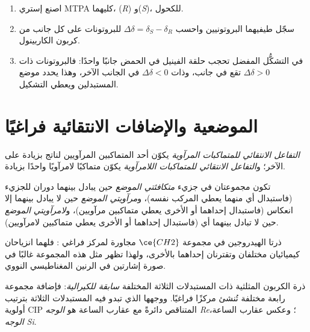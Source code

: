 \begin{method}\label{met:b3:asymmetric-synthesis:mosher}
\begin{enumerate}
  \item اصنع إستري MTPA كليهما، (\textit{R}) و(\textit{S})، للكحول.
  \item سجّل طيفيهما البروتونيين واحسب $\Delta\delta = \delta_S - \delta_R$ للبروتونات على كل
        جانب من كربون الكاربينول.
  \item في التشكُّل المفضل تحجب حلقة الفينيل في الحمض جانبًا واحدًا:
        فالبروتونات ذات $\Delta\delta > 0$ تقع في جانب، وذات $\Delta\delta < 0$ في الجانب الآخر، وهذا
        يحدد موضع المستبدلين ويعطي التشكيل.
\end{enumerate}
\end{method}

\section{الموضعية والإضافات الانتقائية فراغيًا}

\begin{definition}\label{def:b3:asymmetric-synthesis:selective}
\emph{التفاعل الانتقائي للمتماكبات المرآوية} يكوّن أحد
المتماكبين المرآويين لناتج بزيادة على الآخر؛ و\emph{التفاعل الانتقائي للمتماكبات
اللامرآوية} يكوّن متماكبًا لامرآويًا واحدًا بزيادة.
\end{definition}

\begin{definition}[الموضعية]\label{def:b3:asymmetric-synthesis:topicity}
تكون مجموعتان في جزيء \emph{متكافئتي الموضع} حين يبادل بينهما
دوران للجزيء (فاستبدال أي منهما يعطي المركب نفسه)،
و\emph{مرآويتي الموضع} حين لا يبادل بينهما إلا انعكاس
(فاستبدال إحداهما أو الأخرى يعطي متماكبين مرآويين)، 
و\emph{لامرآويتي الموضع} حين لا تبادل بينهما أي 
(فاستبدال إحداهما أو الأخرى يعطي متماكبين لامرآويين).
\end{definition}

ذرتا الهيدروجين في مجموعة $\ce{CH2}$ مجاورة لمركز فراغي : فلهما
انزياحان كيميائيان مختلفان وتقترنان إحداهما بالأخرى، ولهذا تظهر مثل هذه
المجموعة غالبًا في صورة إشارتين في الرنين المغناطيسي النووي.

\begin{definition}\label{def:b3:asymmetric-synthesis:faces}
ذرة الكربون المثلثية ذات المستبدلات الثلاثة المختلفة \emph{سابقة للكيرالية}:
فإضافة مجموعة رابعة مختلفة تُنشئ مركزًا فراغيًا. ووجهها الذي تبدو فيه
المستبدلات الثلاثة بترتيب أولوية CIP المتناقص دائرةً مع عقارب الساعة هو
\emph{الوجه Re}؛ وعكس عقارب الساعة، \emph{الوجه Si}.
\end{definition}

